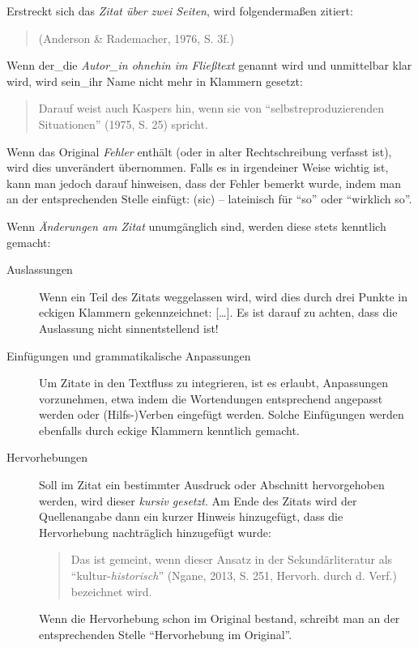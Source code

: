 \documentclass[ngerman,oneside,12pt,a4paper]{scrbook}
\begin{document}
Erstreckt sich das \emph{Zitat über zwei Seiten}, wird folgendermaßen
zitiert:

\begin{quote}
(Anderson \& Rademacher, 1976, S. 3f.)
\end{quote}

Wenn der\_die \emph{Autor\_in ohnehin im Fließtext} genannt wird und
unmittelbar klar wird, wird sein\_ihr Name nicht mehr in Klammern
gesetzt:

\begin{quote}
Darauf weist auch Kaspers hin, wenn sie von
\enquote{selbstreproduzierenden Situationen} (1975, S. 25) spricht.
\end{quote}

Wenn das Original \emph{Fehler} enthält (oder in alter Rechtschreibung
verfasst ist), wird dies unverändert übernommen. Falls es in irgendeiner
Weise wichtig ist, kann man jedoch darauf hinweisen, dass der Fehler
bemerkt wurde, indem man an der entsprechenden Stelle einfügt: (sic) --
lateinisch für \enquote{so} oder \enquote{wirklich so}.

Wenn \emph{Änderungen am Zitat} unumgänglich sind, werden diese stets
kenntlich gemacht:

\begin{description}
\item[Auslassungen]
Wenn ein Teil des Zitats weggelassen wird, wird dies durch drei Punkte
in eckigen Klammern gekennzeichnet: {[}\ldots{}{]}. Es ist darauf zu
achten, dass die Auslassung nicht sinnentstellend ist!
\item[Einfügungen und grammatikalische Anpassungen]
Um Zitate in den Textfluss zu integrieren, ist es erlaubt, Anpassungen
vorzunehmen, etwa indem die Wortendungen entsprechend angepasst werden
oder (Hilfs-)Verben eingefügt werden. Solche Einfügungen werden
ebenfalls durch eckige Klammern kenntlich gemacht.
\item[Hervorhebungen]
Soll im Zitat ein bestimmter Ausdruck oder Abschnitt hervorgehoben
werden, wird dieser \emph{kursiv gesetzt}. Am Ende des Zitats wird der
Quellenangabe dann ein kurzer Hinweis hinzugefügt, dass die Hervorhebung
nachträglich hinzugefügt wurde:

\begin{quote}
Das ist gemeint, wenn dieser Ansatz in der Sekundärliteratur als
\enquote{kultur-\emph{historisch}} (Ngane, 2013, S. 251, Hervorh. durch
d. Verf.) bezeichnet wird.
\end{quote}

Wenn die Hervorhebung schon im Original bestand, schreibt man an der
entsprechenden Stelle \enquote{Hervorhebung im Original}.
\end{description}
\end{document}
